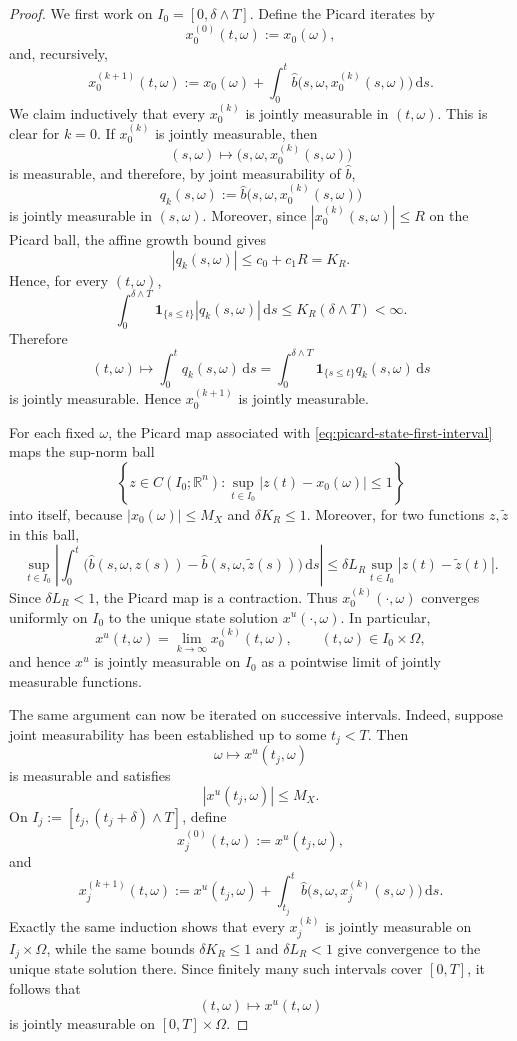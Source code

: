 \documentclass[11pt]{amsart}
\numberwithin{equation}{section} %
\newcommand{\dd}{\mathrm{d}}
\theoremstyle{remark}
\begin{document}
\begin{proof}
We first work on $I_0=[0,\delta\wedge T]$.  Define the Picard
iterates by
\[
x^{(0)}_0(t,\omega):=x_0(\omega),
\]
and, recursively,
\begin{equation}
\label{eq:picard-state-first-interval}
x^{(k+1)}_0(t,\omega)
:=
x_0(\omega)
+
\int_0^t
\widehat b\bigl(s,\omega,x^{(k)}_0(s,\omega)\bigr)\,\dd s.
\end{equation}
We claim inductively that every $x^{(k)}_0$ is jointly measurable in
$(t,\omega)$.  This is clear for $k=0$.  If $x^{(k)}_0$ is jointly
measurable, then
\[
(s,\omega)
\longmapsto
\bigl(s,\omega,x^{(k)}_0(s,\omega)\bigr)
\]
is measurable, and therefore, by joint measurability of $\widehat b$,
\[
q_k(s,\omega)
:=
\widehat b\bigl(s,\omega,x^{(k)}_0(s,\omega)\bigr)
\]
is jointly measurable in $(s,\omega)$.  
Moreover, since $|x^{(k)}_0(s,\omega)|\le R$ on the Picard ball,
the affine growth bound gives
\[
|q_k(s,\omega)|
\le c_0+c_1R
=K_R.
\]
Hence, for every $(t,\omega)$,
\[
\int_0^{\delta\wedge T}
\mathbf 1_{\{s\le t\}}
|q_k(s,\omega)|\,\dd s
\le K_R(\delta\wedge T)<\infty.
\]
Therefore
\[
(t,\omega)\longmapsto
\int_0^t q_k(s,\omega)\,\dd s
=
\int_0^{\delta\wedge T}
\mathbf 1_{\{s\le t\}}q_k(s,\omega)\,\dd s
\]
is jointly measurable. Hence $x^{(k+1)}_0$ is jointly measurable.

For each fixed $\omega$, the Picard map associated with
\eqref{eq:picard-state-first-interval} maps the sup-norm ball
\[
\left\{
z\in C(I_0;\mathbb R^n):
\sup_{t\in I_0}|z(t)-x_0(\omega)|\le1
\right\}
\]
into itself, because $|x_0(\omega)|\le M_X$ and
$\delta K_R\le1$.  Moreover, for two functions $z,\widetilde z$
in this ball,
\[
\sup_{t\in I_0}
\left|
\int_0^t
\bigl(
\widehat b(s,\omega,z(s))
-
\widehat b(s,\omega,\widetilde z(s))
\bigr)\,\dd s
\right|
\le
\delta L_R
\sup_{t\in I_0}|z(t)-\widetilde z(t)|.
\]
Since $\delta L_R<1$, the Picard map is a contraction.  Thus
$x^{(k)}_0(\cdot,\omega)$ converges uniformly on $I_0$ to the unique
state solution $x^u(\cdot,\omega)$.  In particular,
\[
x^u(t,\omega)
=
\lim_{k\to\infty}x^{(k)}_0(t,\omega),
\qquad
(t,\omega)\in I_0\times\Omega,
\]
and hence $x^u$ is jointly measurable on $I_0$ as a pointwise limit
of jointly measurable functions.

The same argument can now be iterated on successive intervals.
Indeed, suppose joint measurability has been established up to some
$t_j<T$.  Then
\[
\omega\longmapsto x^u(t_j,\omega)
\]
is measurable and satisfies
\[
|x^u(t_j,\omega)|\le M_X.
\]
On $I_j:=[t_j,(t_j+\delta)\wedge T]$, define
\[
x^{(0)}_j(t,\omega):=x^u(t_j,\omega),
\]
and
\begin{equation}
\label{eq:picard-state-successive-interval}
x^{(k+1)}_j(t,\omega)
:=
x^u(t_j,\omega)
+
\int_{t_j}^t
\widehat b\bigl(s,\omega,x^{(k)}_j(s,\omega)\bigr)\,\dd s.
\end{equation}
Exactly the same induction shows that every $x^{(k)}_j$ is jointly
measurable on $I_j\times\Omega$, while the same bounds
$\delta K_R\le1$ and $\delta L_R<1$ give convergence to the unique
state solution there.  Since finitely many such intervals cover
$[0,T]$, it follows that
\[
(t,\omega)\longmapsto x^u(t,\omega)
\]
is jointly measurable on $[0,T]\times\Omega$.


\end{proof}
\end{document}

